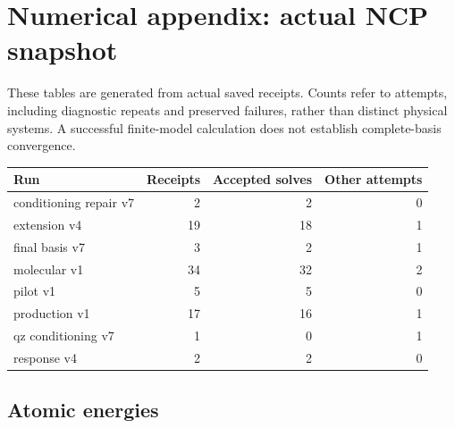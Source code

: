 \documentclass[
  10pt,
]{article}
\begin{document}
\hypertarget{numerical-appendix-actual-ncp-snapshot}{%
\section{Numerical appendix: actual NCP
snapshot}\label{numerical-appendix-actual-ncp-snapshot}}

These tables are generated from actual saved receipts. Counts refer to
attempts, including diagnostic repeats and preserved failures, rather
than distinct physical systems. A successful finite-model calculation
does not establish complete-basis convergence.

\begin{longtable}[]{@{}lrrr@{}}
\toprule\noalign{}
Run & Receipts & Accepted solves & Other attempts \\
\midrule\noalign{}
\endhead
\bottomrule\noalign{}
\endlastfoot
conditioning repair v7 & 2 & 2 & 0 \\
extension v4 & 19 & 18 & 1 \\
final basis v7 & 3 & 2 & 1 \\
molecular v1 & 34 & 32 & 2 \\
pilot v1 & 5 & 5 & 0 \\
production v1 & 17 & 16 & 1 \\
qz conditioning v7 & 1 & 0 & 1 \\
response v4 & 2 & 2 & 0 \\
\end{longtable}

\hypertarget{atomic-energies}{%
\subsection{Atomic energies}\label{atomic-energies}}
\end{document}

